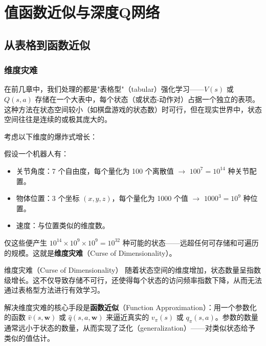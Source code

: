 \chapter{值函数近似与深度Q网络}


\section{从表格到函数近似}

\subsection{维度灾难}

在前几章中，我们处理的都是"表格型"（tabular）强化学习——$V(s)$ 或 $Q(s,a)$ 存储在一个大表中，每个状态（或状态-动作对）占据一个独立的表项。这种方法在状态空间较小（如棋盘游戏的状态数）时可行，但在现实世界中，状态空间往往是连续的或极其庞大的。

考虑以下维度的爆炸式增长：

\begin{example}[维度灾难的具体表现]
假设一个机器人有：
\begin{itemize}
    \item 关节角度：7 个自由度，每个量化为 100 个离散值 $\rightarrow$ $100^7 = 10^{14}$ 种关节配置。
    \item 物体位置：3 个坐标 $(x, y, z)$，每个量化为 1000 个值 $\rightarrow$ $1000^3 = 10^9$ 种位置。
    \item 速度：与位置类似的维度数。
\end{itemize}

仅这些便产生 $10^{14} \times 10^9 \times 10^9 = 10^{32}$ 种可能的状态——远超任何可存储和可遍历的规模。这就是\textbf{维度灾难}（Curse of Dimensionality）。
\end{example}

\begin{mydefinition}{维度灾难（Curse of Dimensionality）}
随着状态空间的维度增加，状态数量呈指数级增长。这不仅导致存储不可行，还使得每个状态的访问频率指数下降，从而无法通过表格型方法进行有效学习。
\end{mydefinition}

解决维度灾难的核心手段是\textbf{函数近似}（Function Approximation）：用一个参数化的函数 $\hat{v}(s, \mathbf{w})$ 或 $\hat{q}(s, a, \mathbf{w})$ 来逼近真实的 $v_{\pi}(s)$ 或 $q_{\pi}(s,a)$。参数的数量通常远小于状态的数量，从而实现了泛化（generalization）——对类似状态给予类似的值估计。

